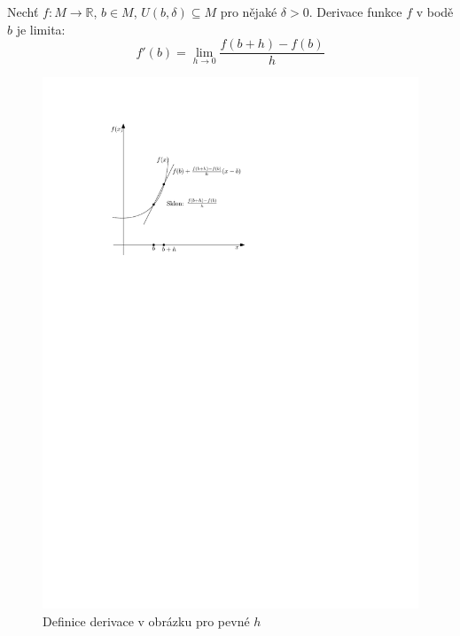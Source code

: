 \begin{definition}
	Nechť $f \colon M \rightarrow \mathbb{R}$, $b \in M$, $U(b, \delta) \subseteq M$ pro nějaké $\delta > 0$.
	Derivace funkce $f$ v bodě $b$ je limita:
	$$f'(b) = \lim_{h \rightarrow 0} \frac{f(b + h) - f(b)}{h}$$
	\label{def:derivace}
\end{definition}

\begin{figure}[h]
	\centering
	\includegraphics{tahaky/fig/derivace.pdf}
	\caption{Definice derivace v obrázku pro pevné $h$}
	\label{fig:def:derivace}
\end{figure}


